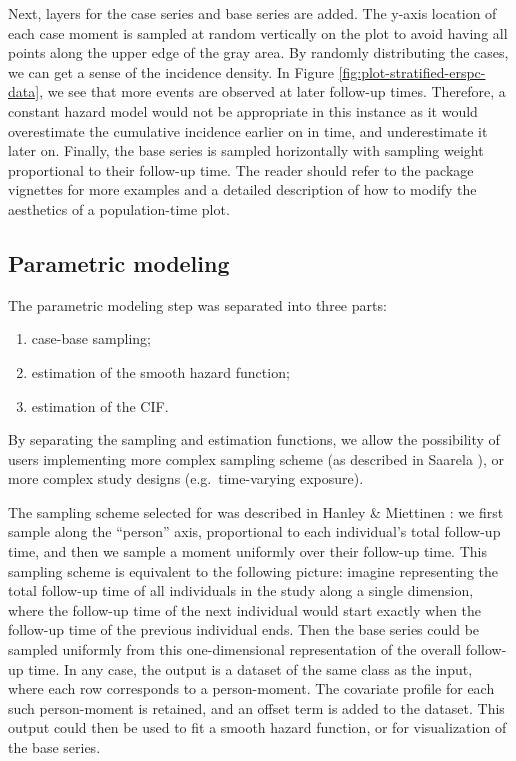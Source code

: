 Next, layers for the case series and base series are added. The y-axis
location of each case moment is sampled at random vertically on the plot
to avoid having all points along the upper edge of the gray area. By
randomly distributing the cases, we can get a sense of the incidence
density. In Figure \ref{fig:plot-stratified-erspc-data}, we see that
more events are observed at later follow-up times. Therefore, a constant
hazard model would not be appropriate in this instance as it would
overestimate the cumulative incidence earlier on in time, and
underestimate it later on. Finally, the base series is sampled
horizontally with sampling weight proportional to their follow-up time.
The reader should refer to the package vignettes for more examples and a
detailed description of how to modify the aesthetics of a
population-time plot.

\hypertarget{parametric-modeling}{%
\subsection{Parametric modeling}\label{parametric-modeling}}

The parametric modeling step was separated into three parts:

\begin{enumerate}
\def\labelenumi{\arabic{enumi}.}
\tightlist
\item
  case-base sampling;
\item
  estimation of the smooth hazard function;
\item
  estimation of the CIF.
\end{enumerate}

By separating the sampling and estimation functions, we allow the
possibility of users implementing more complex sampling scheme (as
described in Saarela \citeyearpar{saarela2016case}), or more complex
study designs (e.g.~time-varying exposure).

The sampling scheme selected for  was described in
Hanley \& Miettinen \citeyearpar{hanley2009fitting}: we first sample
along the ``person'' axis, proportional to each individual's total
follow-up time, and then we sample a moment uniformly over their
follow-up time. This sampling scheme is equivalent to the following
picture: imagine representing the total follow-up time of all
individuals in the study along a single dimension, where the follow-up
time of the next individual would start exactly when the follow-up time
of the previous individual ends. Then the base series could be sampled
uniformly from this one-dimensional representation of the overall
follow-up time. In any case, the output is a dataset of the same class
as the input, where each row corresponds to a person-moment. The
covariate profile for each such person-moment is retained, and an offset
term is added to the dataset. This output could then be used to fit a
smooth hazard function, or for visualization of the base series.

